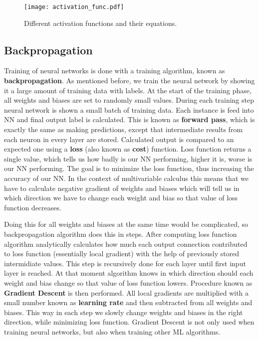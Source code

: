 \begin{figure}[ht!]
        \centering
        \texttt{[image: activation\_func.pdf]} 
        \caption{Different activation functions and their equations.}
        \label{activation_functions}
\end{figure}


\subsection{ Backpropagation}

Training of neural networks is done with a training algorithm, known as \textbf{backpropagation}.
As mentioned before, we train the neural network by showing it a large amount of training data with labels.
At the start of the training phase, all weights and biases are set to randomly small values.
During each training step neural network is shown a small batch of training data. 
Each instance is feed into NN and final output label is calculated.
This is known as \textbf{forward pass}, which is exactly the same as making predictions, except that intermediate results from each neuron in every layer are stored.
Calculated output is compared to an expected one using a \textbf{loss} (also known as \textbf{cost}) function.
Loss function returns a single value, which tells us how badly is our NN performing, higher it is, worse is our NN performing.
The goal is to minimize the loss function, thus increasing the accuracy of our NN.
In the context of multivariable calculus this means that we have to calculate negative gradient of weights and biases which will tell us in which direction we have to change each weight and bias so that value of loss function decreases. 

Doing this for all weights and biases at the same time would be complicated, so backpropagation algorithm does this in steps.
After computing loss function algorithm analytically calculates how much each output connection contributed to loss function (essentially local gradient) with the help of previously stored intermidiate values.
This step is recursively done for each layer until first input layer is reached.
At that moment algorithm knows in which direction should each weight and bias change so that value of loss function lowers.
Procedure known as \textbf{Gradient Descent} is then performed.
All local gradients are multiplied with a small number known as \textbf{learning rate} and then subtracted from all weights and biases.
This way in each step we slowly change weights and biases in the right direction, while minimizing loss function.
Gradient Descent is not only used when training neural networks, but also when training other ML algorithms.

